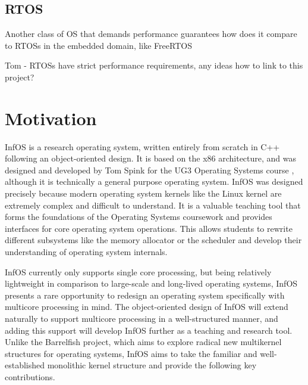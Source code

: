 \documentclass[bsc,frontabs,singlespacing,parskip,deptreport]{infthesis}     %
\begin{document}
\subsection{RTOS}
Another class of OS that demands performance guarantees
how does it compare to RTOSs in the embedded domain, like FreeRTOS

Tom - RTOSs have strict performance requirements, any ideas how to link to this project?

\section{Motivation} \label{motivation}
InfOS \cite{infos} is a research operating system, written entirely from scratch in C++ following an object-oriented design. It is based on the x86 architecture, and was designed and developed by Tom Spink for the UG3 Operating Systems course \cite{ug3os}, although it is technically a general purpose operating system. InfOS was designed precisely because modern operating system kernels like the Linux kernel are extremely complex and difficult to understand. It is a valuable teaching tool that forms the foundations of the Operating Systems coursework and provides interfaces for core operating system operations. This allows students to rewrite different subsystems like the memory allocator or the scheduler and develop their understanding of operating system internals. 

InfOS currently only supports single core processing, but being relatively lightweight in comparison to large-scale and long-lived operating systems, InfOS presents a rare opportunity to redesign an operating system specifically with multicore processing in mind. The object-oriented design of InfOS will extend naturally to support multicore processing in a well-structured manner, and adding this support will develop InfOS further as a teaching and research tool. Unlike the Barrelfish project, which aims to explore radical new multikernel structures for operating systems, InfOS aims to take the familiar and well-established monolithic kernel structure and provide the following key contributions.
\end{document}
